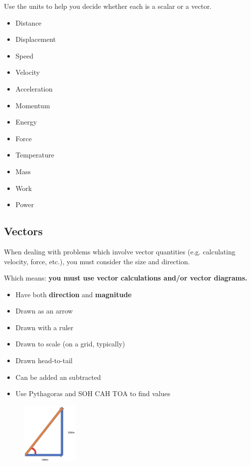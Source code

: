 \documentclass{report}
\begin{document}
Use the units to help you decide whether each is a scalar or a vector.

\begin{itemize}
    \item Distance
    \item Displacement
    \item Speed
    \item Velocity
    \item Acceleration
    \item Momentum
    \item Energy
    \item Force
    \item Temperature
    \item Mass
    \item Work
    \item Power
\end{itemize}

\subsection{Vectors}

When dealing with problems which involve vector quantities (e.g. calculating velocity, force, etc.), you must consider the size and direction.

Which means: \textbf{you must use vector calculations and/or vector diagrams.}

\begin{itemize}
    \item Have both \textbf{direction} and \textbf{magnitude}
    \item Drawn as an arrow
    \item Drawn with a ruler
    \item Drawn to scale (on a grid, typically)
    \item Drawn head-to-tail
    \item Can be added an subtracted
    \item Use Pythagoras and SOH CAH TOA to find values
\end{itemize}

\begin{figure}
    \centering
    \includegraphics[width=0.25\textwidth]{trigonometry.png}
\end{figure}
\end{document}
